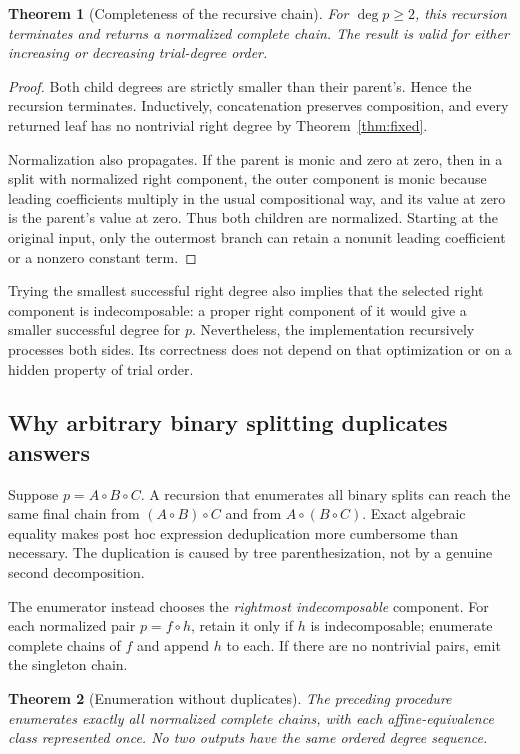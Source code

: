 \documentclass[11pt,letterpaper]{article}
\newtheorem{theorem}{Theorem}[section]
\theoremstyle{definition}
\theoremstyle{remark}
\begin{document}
\begin{theorem}[Completeness of the recursive chain]\label{thm:chain}
For $\deg p\geq2$, this recursion terminates and returns a normalized
complete chain. The result is valid for either increasing or decreasing
trial-degree order.
\end{theorem}

\begin{proof}
Both child degrees are strictly smaller than their parent's. Hence the
recursion terminates. Inductively, concatenation preserves composition,
and every returned leaf has no nontrivial right degree by
Theorem~\ref{thm:fixed}.

Normalization also propagates. If the parent is monic and zero at zero,
then in a split with normalized right component, the outer component is
monic because leading coefficients multiply in the usual compositional
way, and its value at zero is the parent's value at zero. Thus both
children are normalized. Starting at the original input, only the
outermost branch can retain a nonunit leading coefficient or a nonzero
constant term.
\end{proof}

Trying the smallest successful right degree also implies that the
selected right component is indecomposable: a proper right component
of it would give a smaller successful degree for $p$. Nevertheless, the
implementation recursively processes both sides. Its correctness does
not depend on that optimization or on a hidden property of trial order.

\subsection{Why arbitrary binary splitting duplicates answers}
Suppose $p=A\circ B\circ C$. A recursion that enumerates all binary
splits can reach the same final chain from $(A\circ B)\circ C$ and from
$A\circ(B\circ C)$. Exact algebraic equality makes post hoc expression
deduplication more cumbersome than necessary. The duplication is caused
by tree parenthesization, not by a genuine second decomposition.

The enumerator instead chooses the \emph{rightmost indecomposable}
component. For each normalized pair $p=f\circ h$, retain it only if
$h$ is indecomposable; enumerate complete chains of $f$ and append $h$
to each. If there are no nontrivial pairs, emit the singleton chain.

\begin{theorem}[Enumeration without duplicates]\label{thm:all}
The preceding procedure enumerates exactly all normalized complete
chains, with each affine-equivalence class represented once. No two
outputs have the same ordered degree sequence.
\end{theorem}
\end{document}
